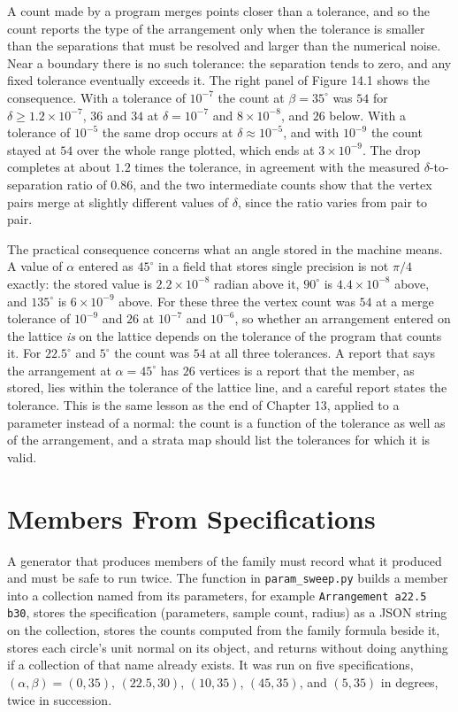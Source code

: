 A count made by a program merges points closer than a tolerance, and so the count reports the type of the arrangement only when the tolerance is smaller than the separations that must be resolved and larger than the numerical noise. Near a boundary there is no such tolerance: the separation tends to zero, and any fixed tolerance eventually exceeds it. The right panel of Figure 14.1 shows the consequence. With a tolerance of $10^{-7}$ the count at $\beta=35^\circ$ was $54$ for $\delta\ge1.2\times10^{-7}$, $36$ and $34$ at $\delta=10^{-7}$ and $8\times10^{-8}$, and $26$ below. With a tolerance of $10^{-5}$ the same drop occurs at $\delta\approx10^{-5}$, and with $10^{-9}$ the count stayed at $54$ over the whole range plotted, which ends at $3\times10^{-9}$. The drop completes at about $1.2$ times the tolerance, in agreement with the measured $\delta$-to-separation ratio of $0.86$, and the two intermediate counts show that the vertex pairs merge at slightly different values of $\delta$, since the ratio varies from pair to pair.

The practical consequence concerns what an angle stored in the machine means. A value of $\alpha$ entered as $45^\circ$ in a field that stores single precision is not $\pi/4$ exactly: the stored value is $2.2\times10^{-8}$ radian above it, $90^\circ$ is $4.4\times10^{-8}$ above, and $135^\circ$ is $6\times10^{-9}$ above. For these three the vertex count was $54$ at a merge tolerance of $10^{-9}$ and $26$ at $10^{-7}$ and $10^{-6}$, so whether an arrangement entered on the lattice \emph{is} on the lattice depends on the tolerance of the program that counts it. For $22.5^\circ$ and $5^\circ$ the count was $54$ at all three tolerances. A report that says the arrangement at $\alpha=45^\circ$ has $26$ vertices is a report that the member, as stored, lies within the tolerance of the lattice line, and a careful report states the tolerance. This is the same lesson as the end of Chapter 13, applied to a parameter instead of a normal: the count is a function of the tolerance as well as of the arrangement, and a strata map should list the tolerances for which it is valid.

\section{Members From Specifications}

A generator that produces members of the family must record what it produced and must be safe to run twice. The function in \texttt{param\_sweep.py} builds a member into a collection named from its parameters, for example \texttt{Arrangement a22.5 b30}, stores the specification (parameters, sample count, radius) as a JSON string on the collection, stores the counts computed from the family formula beside it, stores each circle's unit normal on its object, and returns without doing anything if a collection of that name already exists. It was run on five specifications, $(\alpha,\beta)=(0,35)$, $(22.5,30)$, $(10,35)$, $(45,35)$, and $(5,35)$ in degrees, twice in succession.

